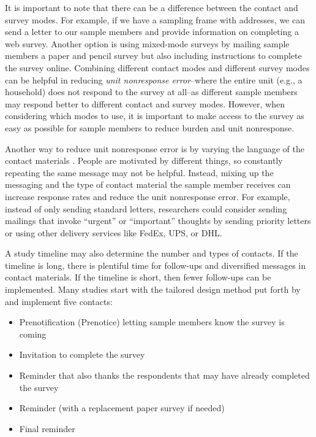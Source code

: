 \documentclass[
]{krantz}
\providecommand{\tightlist}{%
  \setlength{\itemsep}{0pt}\setlength{\parskip}{0pt}}
\begin{document}
It is important to note that there can be a difference between the contact and survey modes. For example, if we have a sampling frame with addresses, we can send a letter to our sample members and provide information on completing a web survey. Another option is using mixed-mode surveys by mailing sample members a paper and pencil survey but also including instructions to complete the survey online. Combining different contact modes and different survey modes can be helpful in reducing \emph{unit nonresponse error}--where the entire unit (e.g., a household) does not respond to the survey at all--as different sample members may respond better to different contact and survey modes. However, when considering which modes to use, it is important to make access to the survey as easy as possible for sample members to reduce burden and unit nonresponse.

Another way to reduce unit nonresponse error is by varying the language of the contact materials \citep{dillman2014mode}. People are motivated by different things, so constantly repeating the same message may not be helpful. Instead, mixing up the messaging and the type of contact material the sample member receives can increase response rates and reduce the unit nonresponse error. For example, instead of only sending standard letters, researchers could consider sending mailings that invoke ``urgent'' or ``important'' thoughts by sending priority letters or using other delivery services like FedEx, UPS, or DHL.

A study timeline may also determine the number and types of contacts. If the timeline is long, there is plentiful time for follow-ups and diversified messages in contact materials. If the timeline is short, then fewer follow-ups can be implemented. Many studies start with the tailored design method put forth by \citet{dillman2014mode} and implement five contacts:

\begin{itemize}
\tightlist
\item
  Prenotification (Prenotice) letting sample members know the survey is coming
\item
  Invitation to complete the survey
\item
  Reminder that also thanks the respondents that may have already completed the survey
\item
  Reminder (with a replacement paper survey if needed)
\item
  Final reminder
\end{itemize}
\end{document}
